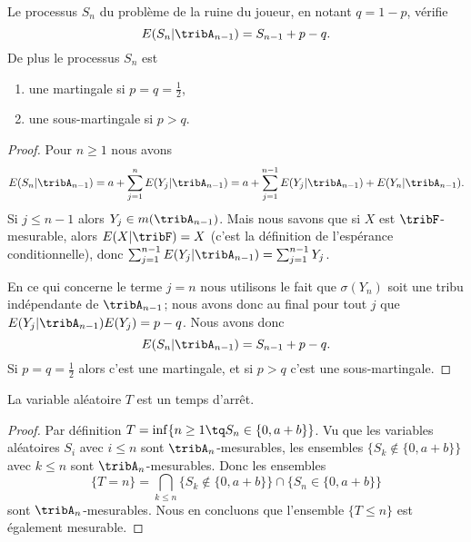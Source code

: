 \begin{lemma}   \label{LemEOAmVyZ}
	Le processus \( S_n\) du problème de la ruine du joueur, en notant \( q=1-p\), vérifie
	\begin{equation}    \label{EqZQtwVMXyiB}
		E(S_n|\tribA_{n-1})=S_{n-1}+p-q.
	\end{equation}
	De plus le processus \( S_n\) est
	\begin{enumerate}
		\item
		      une martingale si \( p=q=\frac{ 1 }{2}\),
		\item
		      une sous-martingale si \( p>q\).
	\end{enumerate}
\end{lemma}

\begin{proof}
	Pour \( n\geq 1 \) nous avons
	\begin{equation}
		E(S_n|\tribA_{n-1})=a+\sum_{j=1}^nE(Y_j|\tribA_{n-1})=a+\sum_{j=1}^{n-1}E(Y_j|\tribA_{n-1})+E(Y_n|\tribA_{n-1}).
	\end{equation}
	Si \( j\leq n-1\) alors \( Y_j\in m(\tribA_{n-1})\). Mais nous savons que si \( X\) est \( \tribF\)-mesurable, alors \( E(X|\tribF)=X\) (c'est la définition de l'espérance conditionnelle), donc \( \sum_{j=1}^{n-1}E(Y_j|\tribA_{n-1})=\sum_{j=1}^{n-1}Y_j\).

	En ce qui concerne le terme \( j=n\) nous utilisons le fait que \( \sigma(Y_n)\) soit une tribu indépendante de \( \tribA_{n-1}\); nous avons donc au final pour tout \( j\) que \( E(Y_j|\tribA_{n-1})E(Y_j)=p-q\). Nous avons donc
	\begin{equation}
		E(S_n|\tribA_{n-1})=S_{n-1}+p-q.
	\end{equation}
	Si \( p=q=\frac{ 1 }{2}\) alors c'est une martingale, et si \( p>q\) c'est une sous-martingale.
\end{proof}

\begin{lemma}   \label{LemXDlNxtE}
	La variable aléatoire \( T\) est un temps d'arrêt.
\end{lemma}

\begin{proof}
	Par définition \( T=\inf\{ n\geq 1\tq S_n\in\{ 0,a+b \} \}\). Vu que les variables aléatoires \( S_i\) avec \( i\leq n\) sont \( \tribA_n\)-mesurables, les ensembles \( \big\{ S_k\notin\{ 0,a+b \} \big\}\) avec \( k\leq n\) sont \( \tribA_n\)-mesurables. Donc les ensembles
	\begin{equation}
		\{ T=n \}=\bigcap_{k\leq n}\big\{ S_k\notin\{ 0,a+b \} \big\}\cap\big\{ S_n\in\{ 0,a+b \} \big\}
	\end{equation}
	sont \( \tribA_n\)-mesurables. Nous en concluons que l'ensemble \( \{ T\leq n \}\) est également mesurable.
\end{proof}

